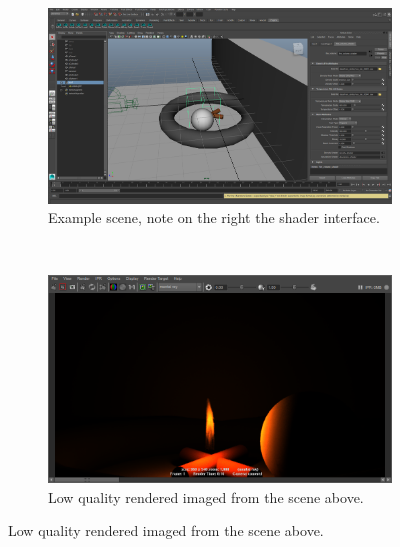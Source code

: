 \begin{figure}[htpb!]
        \centering
        \begin{subfigure}[t]{\textwidth}
                \includegraphics[width=\textwidth]{img/application_example}
                \caption{Example scene, note on the right the shader interface.}
                \label{fig:application_example}
        \end{subfigure}%
        \\  %
        \begin{subfigure}[t]{\textwidth}
                \includegraphics[width=\textwidth]{img/application_example_render}
                \caption{Low quality rendered imaged from the scene above.}
                \label{fig:application_example_render}
        \end{subfigure}
        \label{fig:application_example_full}
\end{figure}

